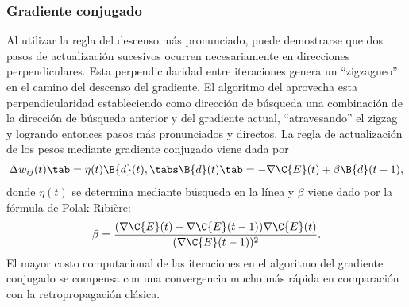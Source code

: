 %
\subsubsection{Gradiente conjugado}
%
Al utilizar la regla del descenso más pronunciado, puede demostrarse
que dos pasos de actualización sucesivos ocurren necesariamente en
direcciones perpendiculares.  Esta perpendicularidad entre iteraciones
genera un ``zigzagueo'' en el camino del descenso del gradiente. El
algoritmo del  aprovecha esta perpendicularidad
estableciendo como dirección de búsqueda una combinación de la
dirección de búsqueda anterior y del gradiente actual, ``atravesando''
el zigzag y logrando entonces pasos más pronunciados y directos.  La
regla de actualización de los pesos mediante gradiente conjugado viene
dada por
%
\begin{align}\label{e2:delta-rule-conjugate}
  \Delta w_{ij}(t)\tab=\eta(t)\B{d}(t), \tabs
  \B{d}(t)\tab=-\nabla{\C{E}(t)}+\beta\B{d}(t-1),
\end{align}
%
donde $\eta(t)$ se determina mediante búsqueda en la línea y $\beta$
viene dado por la fórmula de Polak-Ribière:
%
\begin{align}\label{e2:polak-ribiere}
  \beta=
  \frac{(\nabla{\C{E}(t)}-\nabla{\C{E}(t-1)})\nabla{\C{E}(t)}}{(\nabla{\C{E}(t-1)})^2}.
\end{align}
%
El mayor costo computacional de las iteraciones en el algoritmo del
gradiente conjugado se compensa con una convergencia mucho más rápida
en comparación con la retropropagación clásica.
